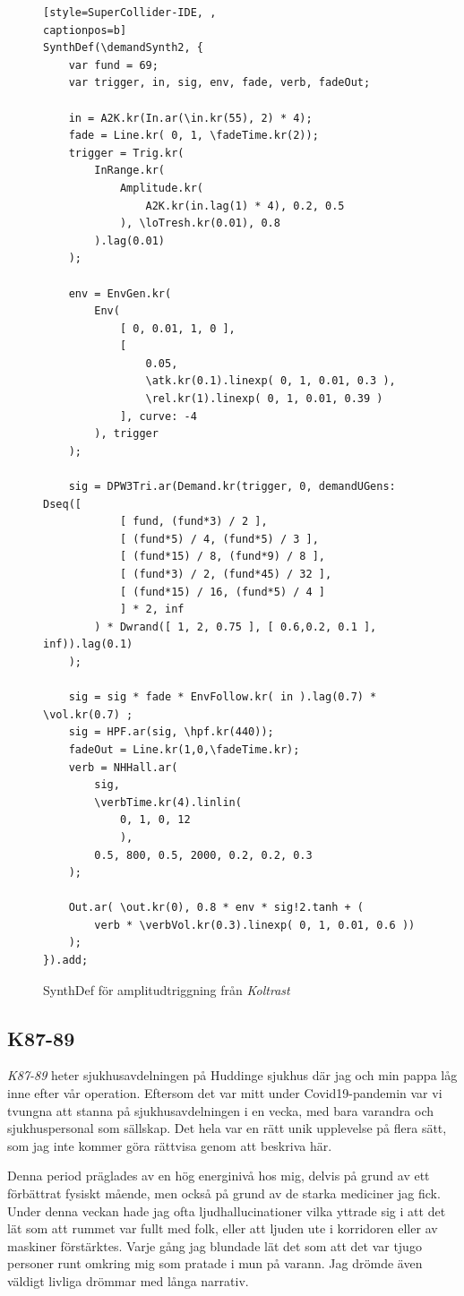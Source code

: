 \documentclass{article}
\renewcommand{\baselinestretch}{1.5}
\begin{document}
\renewcommand{\baselinestretch}{1}
\begin{figure}
\begin{lstlisting}[style=SuperCollider-IDE, ,
captionpos=b]
SynthDef(\demandSynth2, {
	var fund = 69;
	var trigger, in, sig, env, fade, verb, fadeOut;

	in = A2K.kr(In.ar(\in.kr(55), 2) * 4);
	fade = Line.kr( 0, 1, \fadeTime.kr(2));
	trigger = Trig.kr(
		InRange.kr( 
			Amplitude.kr(
				A2K.kr(in.lag(1) * 4), 0.2, 0.5
			), \loTresh.kr(0.01), 0.8 
		).lag(0.01)
	);

	env = EnvGen.kr(
		Env( 
			[ 0, 0.01, 1, 0 ],
			[
				0.05,
				\atk.kr(0.1).linexp( 0, 1, 0.01, 0.3 ),
				\rel.kr(1).linexp( 0, 1, 0.01, 0.39 ) 
			], curve: -4
		), trigger
	);

	sig = DPW3Tri.ar(Demand.kr(trigger, 0, demandUGens: Dseq([ 
			[ fund, (fund*3) / 2 ], 
			[ (fund*5) / 4, (fund*5) / 3 ], 
			[ (fund*15) / 8, (fund*9) / 8 ], 
			[ (fund*3) / 2, (fund*45) / 32 ],  
			[ (fund*15) / 16, (fund*5) / 4 ]
			] * 2, inf
		) * Dwrand([ 1, 2, 0.75 ], [ 0.6,0.2, 0.1 ], inf)).lag(0.1)
	);

	sig = sig * fade * EnvFollow.kr( in ).lag(0.7) * \vol.kr(0.7) ;
	sig = HPF.ar(sig, \hpf.kr(440));
	fadeOut = Line.kr(1,0,\fadeTime.kr);
	verb = NHHall.ar(
		sig, 
		\verbTime.kr(4).linlin(
			0, 1, 0, 12
			), 
		0.5, 800, 0.5, 2000, 0.2, 0.2, 0.3
	);

	Out.ar( \out.kr(0), 0.8 * env * sig!2.tanh + ( 
		verb * \verbVol.kr(0.3).linexp( 0, 1, 0.01, 0.6 ))
	);  
}).add;
\end{lstlisting}
\caption{SynthDef för amplitudtriggning från \emph{Koltrast}}
\end{figure}
\renewcommand{\baselinestretch}{1.5}


\subsection{K87-89}\nocite{K87-89}
\emph{K87-89} heter sjukhusavdelningen på Huddinge sjukhus där jag och min pappa låg inne efter vår operation. 
Eftersom det var mitt under Covid19-pandemin var vi tvungna att stanna på sjukhusavdelningen i en vecka, med bara
varandra och sjukhuspersonal som sällskap. Det hela var en rätt unik upplevelse på flera sätt, som jag inte
kommer göra rättvisa genom att beskriva här. 

Denna period präglades av en hög energinivå hos mig, delvis på grund av ett förbättrat fysiskt mående, men
också på grund av de starka mediciner jag fick. Under denna veckan hade jag ofta ljudhallucinationer vilka
yttrade sig i att det lät som att rummet var fullt med folk, eller att ljuden ute i korridoren eller av
maskiner förstärktes. Varje gång jag blundade lät det som att det var tjugo personer runt omkring mig som
pratade i mun på varann. Jag drömde även väldigt livliga drömmar med långa narrativ. 
\end{document}
